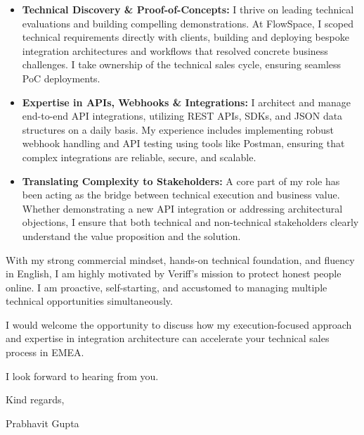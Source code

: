 \documentclass[11pt,a4paper]{article}
\begin{document}
\begin{itemize}[leftmargin=*]
    \item \textbf{Technical Discovery \& Proof-of-Concepts:} I thrive on leading technical evaluations and building compelling demonstrations. At FlowSpace, I scoped technical requirements directly with clients, building and deploying bespoke integration architectures and workflows that resolved concrete business challenges. I take ownership of the technical sales cycle, ensuring seamless PoC deployments.
    \item \textbf{Expertise in APIs, Webhooks \& Integrations:} I architect and manage end-to-end API integrations, utilizing REST APIs, SDKs, and JSON data structures on a daily basis. My experience includes implementing robust webhook handling and API testing using tools like Postman, ensuring that complex integrations are reliable, secure, and scalable.
    \item \textbf{Translating Complexity to Stakeholders:} A core part of my role has been acting as the bridge between technical execution and business value. Whether demonstrating a new API integration or addressing architectural objections, I ensure that both technical and non-technical stakeholders clearly understand the value proposition and the solution.
\end{itemize}

\noindent With my strong commercial mindset, hands-on technical foundation, and fluency in English, I am highly motivated by Veriff's mission to protect honest people online. I am proactive, self-starting, and accustomed to managing multiple technical opportunities simultaneously. 

\noindent I would welcome the opportunity to discuss how my execution-focused approach and expertise in integration architecture can accelerate your technical sales process in EMEA.

\noindent I look forward to hearing from you.

\vspace{10pt}

\noindent Kind regards,

\vspace{10pt}

\noindent Prabhavit Gupta
\end{document}
